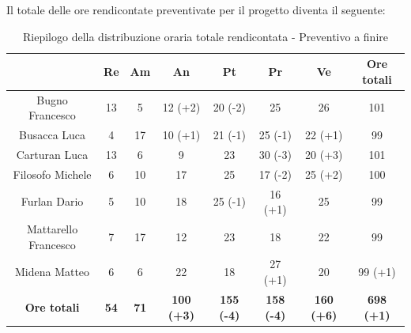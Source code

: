 \pagebreak
Il totale delle ore rendicontate preventivate per il progetto diventa il seguente:

\begin{table}[H]
  \centering
  \renewcommand{\arraystretch}{1.8}
  \begin{tabular}{c|c|c|c|c|c|c|c}
    \rowcolor[HTML]{125E28}
    \multicolumn{1}{c}{\color[HTML]{FFFFFF}\textbf{ Nominativo }}
                         & \multicolumn{1}{c}{\color[HTML]{FFFFFF}\textbf{ Re }}
                         & \multicolumn{1}{c}{\color[HTML]{FFFFFF}\textbf{ Am}}
                         & \multicolumn{1}{c}{\color[HTML]{FFFFFF}\textbf{ An }}
                         & \multicolumn{1}{c}{\color[HTML]{FFFFFF}\textbf{ Pt }}
                         & \multicolumn{1}{c}{\color[HTML]{FFFFFF}\textbf{ Pr }}
                         & \multicolumn{1}{c}{\color[HTML]{FFFFFF}\textbf{ Ve }}
                         & \multicolumn{1}{c}{\color[HTML]{FFFFFF}\textbf{ Ore totali }}                                                                                                                   \\
    \hline
    Bugno Francesco      & 13                                                            & 5           & 12 (+2)           & 20 (-2)           & 25                & 26                & 101               \\
    Busacca Luca         & 4                                                             & 17          & 10 (+1)           & 21 (-1)           & 25 (-1)           & 22 (+1)           & 99                \\
    Carturan Luca        & 13                                                            & 6           & 9                 & 23                & 30 (-3)           & 20 (+3)           & 101               \\
    Filosofo Michele     & 6                                                             & 10          & 17                & 25                & 17 (-2)           & 25 (+2)           & 100               \\
    Furlan Dario         & 5                                                             & 10          & 18                & 25 (-1)           & 16 (+1)           & 25                & 99                \\
    Mattarello Francesco & 7                                                             & 17          & 12                & 23                & 18                & 22                & 99                \\
    Midena Matteo        & 6                                                             & 6           & 22                & 18                & 27 (+1)           & 20                & 99 (+1)           \\
    \textbf{Ore totali}  & \textbf{54}                                                   & \textbf{71} & \textbf{100 (+3)} & \textbf{155 (-4)} & \textbf{158 (-4)} & \textbf{160 (+6)} & \textbf{698 (+1)}
  \end{tabular}
  \caption{Riepilogo della distribuzione oraria totale rendicontata - Preventivo a finire}
\end{table}

